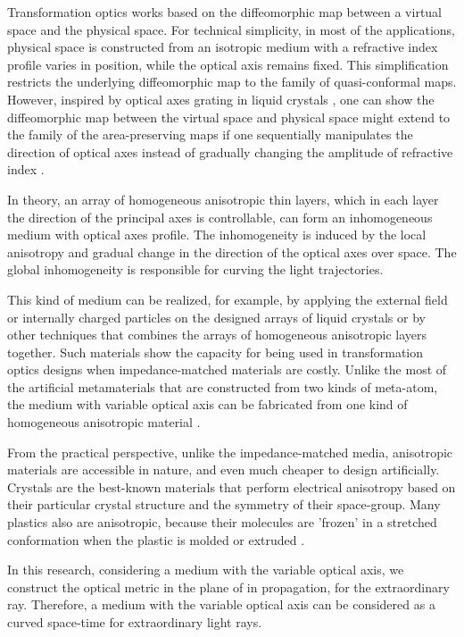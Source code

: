 \documentclass[9pt,twocolumn,twoside]{osajnl}
\begin{document}
Transformation optics works based on the diffeomorphic map between a virtual space and the physical space. 
For technical simplicity, in most of the applications, physical space is constructed from an isotropic medium with a refractive index profile varies in position, while the optical axis remains fixed.
 This simplification restricts the underlying diffeomorphic map to the family of quasi-conformal maps. 
However, inspired by optical axes grating in liquid crystals \cite{Sarkissian, NERSISYAN}, one can show the diffeomorphic map between the virtual space and physical space might extend to the family of the area-preserving maps if one sequentially manipulates the direction of optical axes instead of gradually changing the amplitude of refractive index \cite{liang2012transformation}. 


In theory, an array of homogeneous anisotropic thin layers, which in each layer the direction of the principal axes is controllable, can form an inhomogeneous medium with optical axes profile.  
The inhomogeneity is induced by the local anisotropy and gradual change in the direction of the optical axes over space. The global inhomogeneity is responsible for curving the light trajectories. 

 This kind of medium can be realized, for example, by applying the external field or internally charged particles on the designed arrays of liquid crystals \cite{sluijter2010ray} or by other techniques that combines the arrays of homogeneous anisotropic layers together. Such materials show the capacity for being used in transformation optics designs when impedance-matched materials are costly. 
Unlike the most of the artificial metamaterials that are constructed from two kinds of meta-atom, the medium with variable optical axis can be fabricated from one kind of homogeneous anisotropic material \cite{liang2012transformation}.

From the practical perspective, unlike the impedance-matched media, anisotropic materials are accessible in nature, and even much cheaper to design artificially. Crystals are the best-known materials that perform electrical anisotropy based on their particular crystal structure and the symmetry of their space-group. Many plastics also are anisotropic, because their molecules are 'frozen' in a stretched conformation when the plastic is molded or extruded \cite{PEN}. 

 
In this research, considering a medium with the variable optical axis, we construct the optical metric in the plane of in propagation, for the extraordinary ray. Therefore, a medium with the variable optical axis can be considered as a curved space-time for extraordinary light rays. 
 
\end{document}
